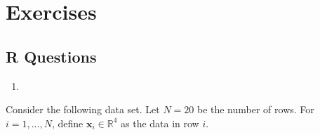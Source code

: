 \documentclass[
  12pt,
  krantz2]{krantz}
\providecommand{\tightlist}{%
  \setlength{\itemsep}{0pt}\setlength{\parskip}{0pt}}
\begin{document}
\hypertarget{exercises-2}{%
\section{Exercises}\label{exercises-2}}

\hypertarget{r-questions-2}{%
\subsection{R Questions}\label{r-questions-2}}

\begin{enumerate}
\def\labelenumi{\arabic{enumi}.}
\tightlist
\item
\end{enumerate}

Consider the following data set. Let \(N = 20\) be the number of rows. For \(i=1,\ldots,N\), define \(\mathbf{x}_i \in \mathbb{R}^4\) as the data in row \(i\).
\end{document}
